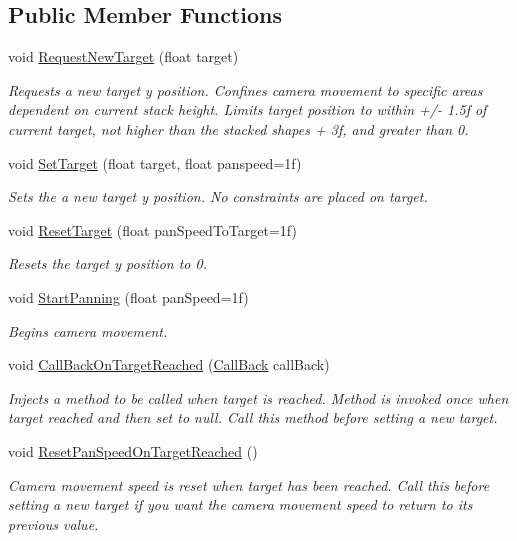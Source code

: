\subsection*{Public Member Functions}
\begin{DoxyCompactItemize}
\item 
void \hyperlink{class_multi_stack_1_1_camera_manager_abe622bf707f58b977ae6535b848dc184}{Request\+New\+Target} (float target)
\begin{DoxyCompactList}\small\item\em Requests a new target y position. Confines camera movement to specific areas dependent on current stack height. Limits target position to within +/-\/ 1.\+5f of current target, not higher than the stacked shapes + 3f, and greater than 0. \end{DoxyCompactList}\item 
void \hyperlink{class_multi_stack_1_1_camera_manager_a081a72450ee5183b5945c49b5757e6db}{Set\+Target} (float target, float panspeed=1f)
\begin{DoxyCompactList}\small\item\em Sets the a new target y position. No constraints are placed on target. \end{DoxyCompactList}\item 
void \hyperlink{class_multi_stack_1_1_camera_manager_a591dc3386c3ba31118b694ded94c3e6f}{Reset\+Target} (float pan\+Speed\+To\+Target=1f)
\begin{DoxyCompactList}\small\item\em Resets the target y position to 0. \end{DoxyCompactList}\item 
void \hyperlink{class_multi_stack_1_1_camera_manager_aa13e9d644f4c815804224367467021c1}{Start\+Panning} (float pan\+Speed=1f)
\begin{DoxyCompactList}\small\item\em Begins camera movement. \end{DoxyCompactList}\item 
void \hyperlink{class_multi_stack_1_1_camera_manager_a3085f8ea5bbe1beb88a3219eba1e51bf}{Call\+Back\+On\+Target\+Reached} (\hyperlink{namespace_multi_stack_a4bd4097b52deebcafccf5815a8495960}{Call\+Back} call\+Back)
\begin{DoxyCompactList}\small\item\em Injects a method to be called when target is reached. Method is invoked once when target reached and then set to null. Call this method before setting a new target. \end{DoxyCompactList}\item 
void \hyperlink{class_multi_stack_1_1_camera_manager_a3625d7638336b34316ffc10bfa84eddd}{Reset\+Pan\+Speed\+On\+Target\+Reached} ()
\begin{DoxyCompactList}\small\item\em Camera movement speed is reset when target has been reached. Call this before setting a new target if you want the camera movement speed to return to its previous value. \end{DoxyCompactList}\end{DoxyCompactItemize}
